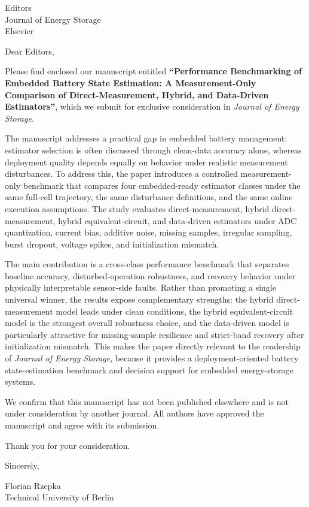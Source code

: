 \documentclass[11pt]{letter}
\date{\today}
\begin{document}
\begin{letter}{Editors\\
Journal of Energy Storage\\
Elsevier}

\opening{Dear Editors,}

Please find enclosed our manuscript entitled \textbf{``Performance Benchmarking of Embedded Battery State Estimation: A Measurement-Only Comparison of Direct-Measurement, Hybrid, and Data-Driven Estimators''}, which we submit for exclusive consideration in \textit{Journal of Energy Storage}.

The manuscript addresses a practical gap in embedded battery management: estimator selection is often discussed through clean-data accuracy alone, whereas deployment quality depends equally on behavior under realistic measurement disturbances. To address this, the paper introduces a controlled measurement-only benchmark that compares four embedded-ready estimator classes under the same full-cell trajectory, the same disturbance definitions, and the same online execution assumptions. The study evaluates direct-measurement, hybrid direct-measurement, hybrid equivalent-circuit, and data-driven estimators under ADC quantization, current bias, additive noise, missing samples, irregular sampling, burst dropout, voltage spikes, and initialization mismatch.

The main contribution is a cross-class performance benchmark that separates baseline accuracy, disturbed-operation robustness, and recovery behavior under physically interpretable sensor-side faults. Rather than promoting a single universal winner, the results expose complementary strengths: the hybrid direct-measurement model leads under clean conditions, the hybrid equivalent-circuit model is the strongest overall robustness choice, and the data-driven model is particularly attractive for missing-sample resilience and strict-band recovery after initialization mismatch. This makes the paper directly relevant to the readership of \textit{Journal of Energy Storage}, because it provides a deployment-oriented battery state-estimation benchmark and decision support for embedded energy-storage systems.

We confirm that this manuscript has not been published elsewhere and is not under consideration by another journal. All authors have approved the manuscript and agree with its submission.

Thank you for your consideration.

\closing{Sincerely,}

Florian Rzepka\\
Technical University of Berlin
\end{letter}
\end{document}
